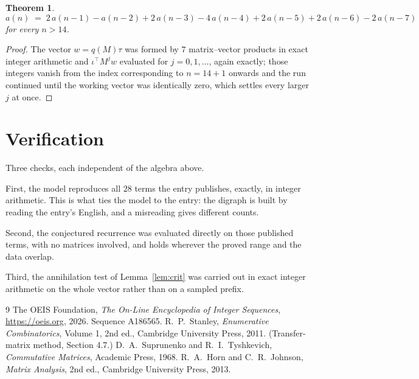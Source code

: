 \documentclass[11pt,a4paper]{article}
\theoremstyle{plain}
\newtheorem{theorem}{Theorem}
\theoremstyle{definition}
\begin{document}
\begin{theorem}
\[
a(n)\;=\;2\,a(n-1) - a(n-2) + 2\,a(n-3) - 4\,a(n-4) + 2\,a(n-5) + 2\,a(n-6) - 2\,a(n-7)
\]
for every $n>14$.
\end{theorem}

\begin{proof}
The vector $w=q(M)\tau$ was formed by $7$ matrix--vector products in exact integer
arithmetic and $\iota^{\!\top}M^{j}w$ evaluated for $j=0,1,\dots$, again exactly; those
integers vanish from the index corresponding to $n=14+1$ onwards and the run continued
until the working vector was identically zero, which settles every larger $j$ at once.
\end{proof}

\section{Verification}

Three checks, each independent of the algebra above.

First, the model reproduces all $28$ terms the entry publishes, exactly, in integer
arithmetic. This is what ties the model to the entry: the digraph is built by reading the
entry's English, and a misreading gives different counts.

Second, the conjectured recurrence was evaluated directly on those published terms, with no
matrices involved, and holds wherever the proved range and the data overlap.

Third, the annihilation test of Lemma~\ref{lem:crit} was carried out in exact integer
arithmetic on the whole vector rather than on a sampled prefix.

\begin{thebibliography}{9}
 The OEIS Foundation, \emph{The On-Line Encyclopedia of Integer
Sequences}, \url{https://oeis.org}, 2026. Sequence A186565.
 R.~P.~Stanley, \emph{Enumerative Combinatorics}, Volume 1, 2nd ed.,
Cambridge University Press, 2011. (Transfer-matrix method, Section 4.7.)
 D.~A.~Suprunenko and R.~I.~Tyshkevich, \emph{Commutative Matrices},
Academic Press, 1968.
 R.~A.~Horn and C.~R.~Johnson, \emph{Matrix Analysis}, 2nd ed., Cambridge
University Press, 2013.
\end{thebibliography}
\end{document}
